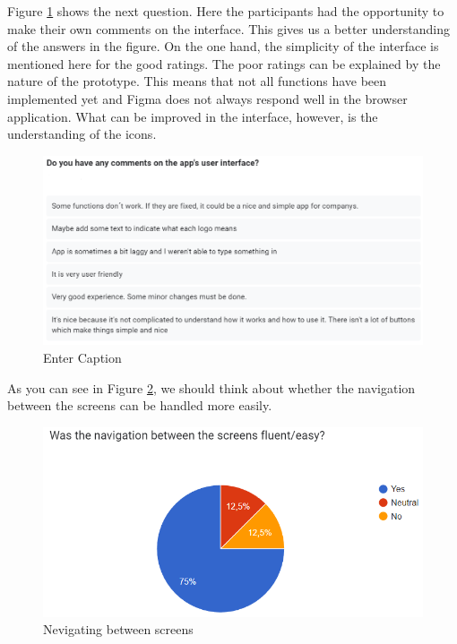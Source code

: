 \documentclass[11pt]{article}
\begin{document}
Figure \ref{fig:comments interface} shows the next question. Here the participants had the opportunity to make their own comments on the interface. This gives us a better understanding of the answers in the figure. On the one hand, the simplicity of the interface is mentioned here for the good ratings. The poor ratings can be explained by the nature of the prototype. This means that not all functions have been implemented yet and Figma does not always respond well in the browser application. What can be improved in the interface, however, is the understanding of the icons.
\begin{figure}[h!]
    \centering
    \includegraphics[width=0.9\linewidth]{figures/comments interface.PNG}
    \caption{Enter Caption}
    \label{fig:comments interface}
\end{figure}

As you can see in Figure \ref{fig:navigating}, we should think about whether the navigation between the screens can be handled more easily. 

\begin{figure}[h!]
    \centering
    \includegraphics[width=0.8\linewidth]{figures/navigation easy.PNG}
    \caption{Nevigating between screens}
    \label{fig:navigating}
\end{figure}

\clearpage
\end{document}
